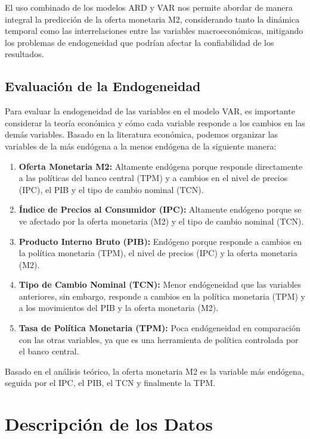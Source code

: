 \documentclass[
  12pt,
]{article}
\providecommand{\tightlist}{%
  \setlength{\itemsep}{0pt}\setlength{\parskip}{0pt}}
\begin{document}
El uso combinado de los modelos ARD y VAR nos permite abordar de manera
integral la predicción de la oferta monetaria M2, considerando tanto la
dinámica temporal como las interrelaciones entre las variables
macroeconómicas, mitigando los problemas de endogeneidad que podrían
afectar la confiabilidad de los resultados.

\subsection{Evaluación de la
Endogeneidad}\label{evaluaciuxf3n-de-la-endogeneidad}

Para evaluar la endogeneidad de las variables en el modelo VAR, es
importante considerar la teoría económica y cómo cada variable responde
a los cambios en las demás variables. Basado en la literatura económica,
podemos organizar las variables de la más endógena a la menos endógena
de la siguiente manera:

\begin{enumerate}
\def\labelenumi{\arabic{enumi}.}
\tightlist
\item
  \textbf{Oferta Monetaria M2:} Altamente endógena porque responde
  directamente a las políticas del banco central (TPM) y a cambios en el
  nivel de precios (IPC), el PIB y el tipo de cambio nominal (TCN).
\item
  \textbf{Índice de Precios al Consumidor (IPC):} Altamente endógeno
  porque se ve afectado por la oferta monetaria (M2) y el tipo de cambio
  nominal (TCN).
\item
  \textbf{Producto Interno Bruto (PIB):} Endógeno porque responde a
  cambios en la política monetaria (TPM), el nivel de precios (IPC) y la
  oferta monetaria (M2).
\item
  \textbf{Tipo de Cambio Nominal (TCN):} Menor endógeneidad que las
  variables anteriores, sin embargo, responde a cambios en la política
  monetaria (TPM) y a los movimientos del PIB y la oferta monetaria
  (M2).
\item
  \textbf{Tasa de Política Monetaria (TPM):} Poca endógeneidad en
  comparación con las otras variables, ya que es una herramienta de
  política controlada por el banco central.
\end{enumerate}

Basado en el análisis teórico, la oferta monetaria M2 es la variable más
endógena, seguida por el IPC, el PIB, el TCN y finalmente la TPM.

\section{Descripción de los Datos}\label{descripciuxf3n-de-los-datos}
\end{document}
